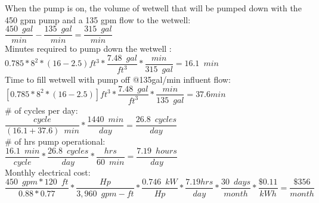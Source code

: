 \begin{enumerate}[1.]
\vspace{0.4cm}
When the pump is on, the volume of wetwell that will be pumped down with the 450 gpm pump and a 135 gpm flow to the wetwell:\\
\vspace{0.4cm}
$\dfrac{450 \enspace gal}{min}-\dfrac{135 \enspace gal}{min}=\dfrac{315 \enspace gal}{min}$\\
\vspace{0.4cm}
Minutes required to pump down the wetwell :\\
\vspace{0.4cm}
$0.785*8^2*(16-2.5)ft^3*\dfrac{7.48 \enspace gal}{ft^3}*\dfrac{min}{315 \enspace gal}=16.1 \enspace min$\\
\vspace{0.4cm}
Time to fill wetwell with pump off @135gal/min influent flow:
\\
\vspace{0.4cm}
$[0.785*8^2*(16-2.5)]ft^3*\dfrac{7.48 \enspace gal}{ft^3}*\dfrac{min}{135 \enspace gal}=37.6min$\\
\vspace{0.4cm}
\# of cycles per day:\\
\vspace{0.4cm}
$\dfrac{cycle}{(16.1+37.6) \enspace min}*\dfrac{1440 \enspace min}{day}=\dfrac{26.8 \enspace cycles}{day}$\\
\vspace{0.4cm}
\# of hrs pump operational:\\
\vspace{0.4cm}
$\dfrac{16.1 \enspace min}{cycle}*\dfrac{26.8 \enspace cycles}{day}*\dfrac{hrs}{60 \enspace min}=\dfrac{7.19 \enspace hours}{day}$\\
\vspace{0.4cm}
Monthly electrical cost:\\
\vspace{0.4cm}
$\dfrac{450 \enspace gpm*120 \enspace ft}{0.88*0.77}*\dfrac{Hp}{3,960 \enspace gpm-ft}*\dfrac{0.746 \enspace kW}{Hp}*\dfrac{7.19hrs}{day}*\dfrac{30 \enspace days}{month}*\dfrac{\$0.11}{kWh}=\boxed{\dfrac{\$356}{month}}$\\
\vspace{0.4cm}


\end{enumerate}
